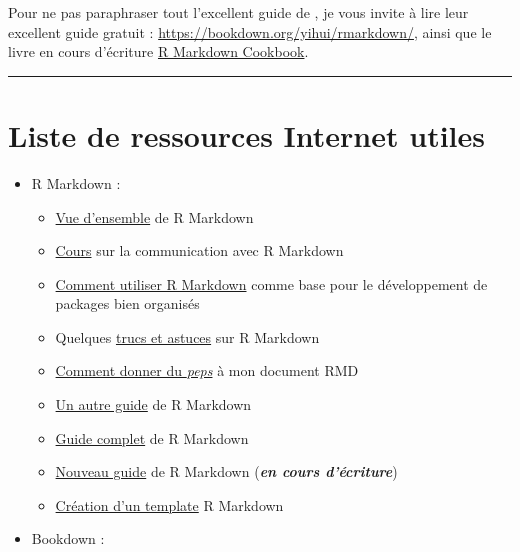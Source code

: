 \documentclass[
  french,
]{book}
\providecommand{\tightlist}{%
  \setlength{\itemsep}{0pt}\setlength{\parskip}{0pt}}
\begin{document}
Pour ne pas paraphraser tout l'excellent guide de \citet{rmarkdown2018}, je vous invite à
lire leur excellent guide gratuit : \url{https://bookdown.org/yihui/rmarkdown/},
ainsi que le livre en cours d'écriture
\href{https://bookdown.org/yihui/rmarkdown-cookbook/}{R Markdown Cookbook}.

\begin{center}\rule{0.5\linewidth}{0.5pt}\end{center}

\hypertarget{ref-rmd}{%
\section*{Liste de ressources Internet utiles}\label{ref-rmd}}

\begin{itemize}
\tightlist
\item
  R Markdown :

  \begin{itemize}
  \tightlist
  \item
    \href{https://rmarkdown.rstudio.com/lesson-1.html}{Vue d'ensemble} de R Markdown
  \item
    \href{https://ysc-rmarkdown.netlify.app/}{Cours} sur la communication avec R Markdown
  \item
    \href{https://emilyriederer.netlify.app/post/rmarkdown-driven-development/}{Comment utiliser R Markdown}
    comme base pour le développement de packages bien organisés
  \item
    Quelques \href{https://www.dataquest.io/blog/r-markdown-tips-tricks-and-shortcuts/}{trucs et astuces}
    sur R Markdown
  \item
    \href{https://holtzy.github.io/Pimp-my-rmd/}{Comment donner du \emph{peps}}
    à mon document RMD
  \item
    \href{https://www.dataquest.io/blog/r-markdown-guide-cheatsheet/}{Un autre guide}
    de R Markdown
  \item
    \href{https://bookdown.org/yihui/rmarkdown/}{Guide complet} de R Markdown
  \item
    \href{https://bookdown.org/yihui/rmarkdown-cookbook/}{Nouveau guide}
    de R Markdown (\textbf{\emph{en cours d'écriture}})
  \item
    \href{https://danawanzer.com/using-r-for-immediate-reporting-in-evaluation/}{Création d'un template}
    R Markdown
  \end{itemize}
\item
  Bookdown :


\end{itemize}
\end{document}
